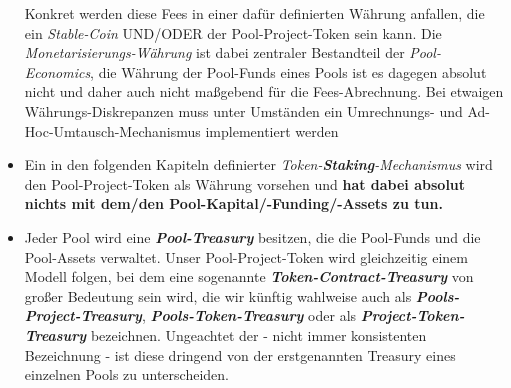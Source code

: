 \begin{Abgrenzung}
\begin{itemize}
	Konkret werden diese Fees in einer dafür definierten Währung anfallen, die ein \textit{Stable-Coin} UND/ODER der Pool-Project-Token sein kann. Die \textit{Monetarisier\-ungs-Währung} ist dabei zentraler Bestandteil der \textit{Pool-Economics}, die Währung der Pool-Funds eines Pools ist es dagegen absolut nicht und daher auch nicht maßgebend für die Fees-Abrechnung. Bei etwaigen Währungs-Diskrepanzen muss unter Umständen ein Umrechnungs- und Ad-Hoc-Umtausch-Mechanismus implementiert werden
	\item Ein in den folgenden Kapiteln definierter \textit{Token-\textbf{Staking}-Mechanismus} wird den Pool-Project-Token als Währung vorsehen und \textbf{hat dabei absolut nichts mit dem/den Pool-Kapital/-Funding/-Assets zu tun.}
	\item Jeder Pool wird eine \textbf{\textit{Pool-Treasury}} besitzen, die die Pool-Funds und die Pool-Assets verwaltet. Unser Pool-Project-Token wird gleichzeitig einem Mo\-dell folgen, bei dem eine sogenannte \textbf{\textit{Token-Contract-Treasury}} von großer Bedeutung sein wird, die wir künftig wahlweise auch als \textbf{\textit{Pools-Project-Treasury}}, \textbf{\textit{Pools-Token-Treasury}} oder als \textbf{\textit{Project-Token-Treasury}} be\-zeichnen. Ungeachtet der - nicht immer konsistenten Bezeichnung - ist diese dringend von der erstgenannten Treasury eines einzelnen Pools zu unterscheiden.
\end{itemize}

\end{Abgrenzung}

